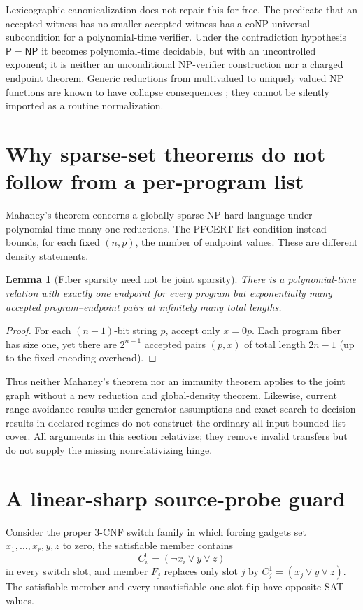 \documentclass[11pt]{article}
\newtheorem{lemma}{Lemma}
\newcommand{\PP}{\mathsf P}
\newcommand{\NP}{\mathsf{NP}}
\begin{document}
Lexicographic canonicalization does not repair this for free. The
predicate that an accepted witness has no smaller accepted witness has
a coNP universal subcondition for a polynomial-time verifier. Under
the contradiction hypothesis $\PP=\NP$ it becomes polynomial-time
decidable, but with an uncontrolled exponent; it is neither an
unconditional NP-verifier construction nor a charged endpoint theorem.
Generic reductions from multivalued to uniquely valued NP functions are
known to have collapse consequences \cite{hnos1996}; they cannot be
silently imported as a routine normalization.

\section{Why sparse-set theorems do not follow from a per-program list}
Mahaney's theorem \cite{mahaney1982} concerns a globally sparse
NP-hard language under polynomial-time many-one reductions. The
PFCERT list condition instead bounds, for each fixed $(n,p)$, the number
of endpoint values. These are different density statements.

\begin{lemma}[Fiber sparsity need not be joint sparsity]
There is a polynomial-time relation with exactly one endpoint for every
program but exponentially many accepted program--endpoint pairs at
infinitely many total lengths.
\end{lemma}
\begin{proof}
For each $(n-1)$-bit string $p$, accept only $x=0p$. Each program fiber
has size one, yet there are $2^{n-1}$ accepted pairs $(p,x)$ of total
length $2n-1$ (up to the fixed encoding overhead).
\end{proof}
Thus neither Mahaney's theorem nor an immunity theorem applies to the
joint graph without a new reduction and global-density theorem.
Likewise, current range-avoidance results under generator assumptions
\cite{renwangzhong2026} and exact search-to-decision results in declared
regimes \cite{hkloliveira2024} do not construct the ordinary all-input
bounded-list cover. All arguments in this section relativize; they
remove invalid transfers but do not supply the missing nonrelativizing
hinge.


\section{A linear-sharp source-probe guard}
Consider the proper 3-CNF switch family in which forcing gadgets set
\(x_1,\ldots,x_r,y,z\) to zero, the satisfiable member contains
\[
 C_i^0=(\neg x_i\vee y\vee z)
\]
in every switch slot, and member \(F_j\) replaces only slot \(j\) by
\(C_j^1=(x_j\vee y\vee z)\).  The satisfiable member and every
unsatisfiable one-slot flip have opposite SAT values.
\end{document}
